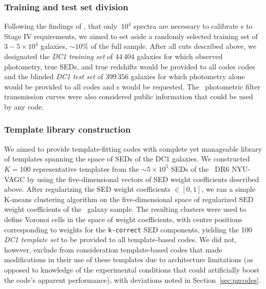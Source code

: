 \subsubsection{Training and test set division}
\label{sec:buzztraining}

Following the findings of \citet{Bernstein:10}, \citet{Masters:2017} that only $~10^{4}$ spectra are necessary to calibrate \pz s to Stage IV requirements, we aimed to set aside a randomly selected training set of $3-5\times 10^{4}$ galaxies, $\sim 10\%$ of the full sample.
After all cuts described above, we designated the \textit{DC1 training set} of $44\,404$ galaxies for which observed photometry, true SEDs, and true redshifts would be provided to all codes codes and the blinded \textit{DC1 test set} of $399\,356$ galaxies for which photometry alone would be provided to all codes and \pzpdf s would be requested.
The \lsst\ photometric filter transmission curves were also considered public information that could be used by any code.

\subsubsection{Template library construction}
\label{sec:buzztemplates}

We aimed to provide template-fitting codes with complete yet manageable library of templates spanning the space of SEDs of the DC1 galaxies.
We constructed $K=100$ representative templates from the $\sim 5 \times 10^{5}$ SEDs of the \sdss\ DR6 NYU-VAGC by using the five-dimensional vectors of SED weight coefficients described above.
After regularizing the SED weight coefficients $\in [0, 1]$, we ran a simple K-means clustering algorithm on the five-dimensional space of regularized SED weight coefficients of the \sdss\ galaxy sample.
The resulting clusters were used to define Voronoi cells in the space of weight coefficients, with centre positions corresponding to weights for the \texttt{k-correct} SED components, yielding the 100 \textit{DC1 template set} to be provided to all template-based codes.
We did not, however, exclude from consideration template-based codes that made modifications in their use of these templates due to architecture limitations (as opposed to knowledge of the experimental conditions that could artificially boost the code's apparent performance), with deviations noted in Section~\ref{sec:pzcodes}.
